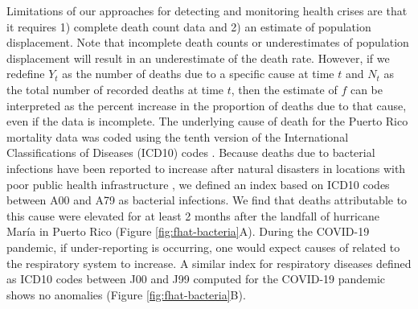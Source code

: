 \documentclass[11pt]{article}
\begin{document}
Limitations of our approaches for detecting and monitoring health crises are that it requires 1) complete death count data and 2) an estimate of population displacement. Note that incomplete death counts or underestimates of population displacement will result in an underestimate of the death rate. However, if we redefine $Y_t$ as the number of deaths due to a specific cause at time $t$ and $N_t$ as the total number of recorded deaths at time $t$, then the estimate of $f$ can be interpreted as the percent increase in the proportion of deaths due to that cause, even if the data is incomplete. The underlying cause of death for the Puerto Rico mortality data was coded using the tenth version of the International Classifications of Diseases (ICD10) codes \cite{world2004icd}. Because deaths due to bacterial infections have been reported to increase after natural disasters in locations with poor public health infrastructure \cite{ligon2006infectious, cook200810th}, we defined an index based on ICD10 codes between A00 and A79 as bacterial infections. We find that deaths attributable to this cause were elevated for at least 2 months after the landfall of hurricane Mar\'ia in Puerto Rico (Figure \ref{fig:fhat-bacteria}A). During the COVID-19 pandemic, if under-reporting is occurring, one would expect causes of related to the respiratory system to increase. A similar index for respiratory diseases defined as ICD10 codes between J00 and J99 computed for the COVID-19 pandemic shows no anomalies  (Figure \ref{fig:fhat-bacteria}B).
\end{document}
